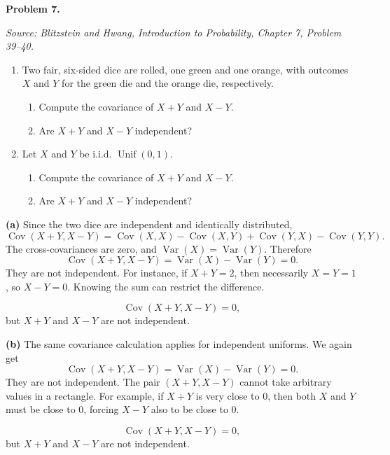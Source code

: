 \documentclass[11pt]{article}
\newcommand{\source}[2]{%
    \vspace{0.15cm}
    {\small\textit{Source: Blitzstein and Hwang, \textit{Introduction to Probability}, Chapter #1, Problem #2.}}
}
\begin{document}


\begin{problemheader}
\textbf{Problem 7. }
\end{problemheader}
\source{7}{39--40}

\begin{enumerate}[label=(\alph*), leftmargin=*]
    \item Two fair, six-sided dice are rolled, one green and one orange, with outcomes $X$ and $Y$ for the green die and the orange die, respectively.
    \begin{enumerate}[label=(\roman*), leftmargin=*]
        \item Compute the covariance of $X+Y$ and $X-Y$.
        \item Are $X+Y$ and $X-Y$ independent?
    \end{enumerate}

    \item Let $X$ and $Y$ be i.i.d. $\operatorname{Unif}(0,1)$.
    \begin{enumerate}[label=(\roman*), leftmargin=*]
        \item Compute the covariance of $X+Y$ and $X-Y$.
        \item Are $X+Y$ and $X-Y$ independent?
    \end{enumerate}
\end{enumerate}

\begin{solutionbox}
\textbf{(a)} Since the two dice are independent and identically distributed,
\[
\operatorname{Cov}(X+Y,X-Y)
=
\operatorname{Cov}(X,X)-\operatorname{Cov}(X,Y)
+\operatorname{Cov}(Y,X)-\operatorname{Cov}(Y,Y).
\]
The cross-covariances are zero, and \(\operatorname{Var}(X)=\operatorname{Var}(Y)\). Therefore
\[
\operatorname{Cov}(X+Y,X-Y)=\operatorname{Var}(X)-\operatorname{Var}(Y)=0.
\]
They are not independent. For instance, if \(X+Y=2\), then necessarily \(X=Y=1\), so \(X-Y=0\). Knowing the sum can restrict the difference.

\begin{finalanswerbox}
\[
\operatorname{Cov}(X+Y,X-Y)=0,
\]
but \(X+Y\) and \(X-Y\) are not independent.
\end{finalanswerbox}

\textbf{(b)} The same covariance calculation applies for independent uniforms. We again get
\[
\operatorname{Cov}(X+Y,X-Y)=\operatorname{Var}(X)-\operatorname{Var}(Y)=0.
\]
They are not independent. The pair \((X+Y,X-Y)\) cannot take arbitrary values in a rectangle. For example, if \(X+Y\) is very close to 0, then both \(X\) and \(Y\) must be close to 0, forcing \(X-Y\) also to be close to 0.

\begin{finalanswerbox}
\[
\operatorname{Cov}(X+Y,X-Y)=0,
\]
but \(X+Y\) and \(X-Y\) are not independent.
\end{finalanswerbox}
\end{solutionbox}
\newpage
\end{document}
